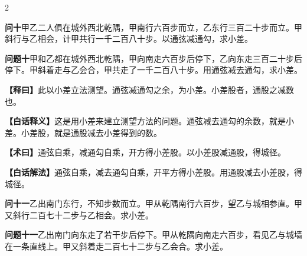 \documentclass[11pt,a4paper]{article}
\newcommand{\WenQuestion}[1]{\textbf{\textcolor{classicalcolor}{#1}}}
\newcommand{\BaiQuestion}[1]{\textbf{\textcolor{moderncolor}{#1}}}
\newcommand{\WenExplain}{\textcolor{classicalcolor}{\textbf{【释曰】}}}
\newcommand{\BaiExplain}{\textcolor{moderncolor}{\textbf{【白话释义】}}}
\newcommand{\WenMethod}{\textcolor{classicalcolor}{\textbf{【术曰】}}}
\newcommand{\BaiMethod}{\textcolor{moderncolor}{\textbf{【白话解法】}}}
\begin{document}
\begin{paracol}{2}

\switchcolumn*
\begin{tcolorbox}[colback=red!3,colframe=red!30!black,boxrule=0.3pt]
\WenQuestion{问十}\quad 甲乙二人俱在城外西北乾隅，甲南行六百步而立，乙东行三百二十步而立。甲斜行与乙相会，计甲共行一千二百八十步。以通弦减通勾，求小差。
\end{tcolorbox}
\switchcolumn
\begin{tcolorbox}[colback=blue!3,colframe=blue!30!black,boxrule=0.3pt]
\BaiQuestion{问题十}\quad 甲和乙都在城外西北乾隅，甲向南走六百步后停下，乙向东走三百二十步后停下。甲斜着走与乙会合，甲共走了一千二百八十步。用通弦减去通勾，求小差。
\end{tcolorbox}

\switchcolumn*
\begin{tcolorbox}[colback=red!5,colframe=red!30!black,boxrule=0.3pt]
\WenExplain\quad 此以小差立法测望。通弦减通勾之余，为小差。小差股者，通股之减数也。
\end{tcolorbox}
\switchcolumn
\begin{tcolorbox}[colback=blue!5,colframe=blue!30!black,boxrule=0.3pt]
\BaiExplain\quad 这是用小差来建立测望方法的问题。通弦减去通勾的余数，就是小差。小差股，就是通股减去小差得到的数。
\end{tcolorbox}

\switchcolumn*
\begin{tcolorbox}[colback=red!5,colframe=red!40!black,boxrule=0.3pt]
\WenMethod\quad 通弦自乘，减通勾自乘，开方得小差股。以小差股减通股，得城径。
\end{tcolorbox}
\switchcolumn
\begin{tcolorbox}[colback=blue!5,colframe=blue!40!black,boxrule=0.3pt]
\BaiMethod\quad 通弦自乘，减去通勾自乘，开平方得小差股。用通股减去小差股，得城径。
\end{tcolorbox}

\vspace{0.8em}

\switchcolumn*
\begin{tcolorbox}[colback=red!3,colframe=red!30!black,boxrule=0.3pt]
\WenQuestion{问十一}\quad 乙出南门东行，不知步数而立。甲从乾隅南行六百步，望乙与城相参直。甲又斜行二百七十二步与乙相会。求小差。
\end{tcolorbox}
\switchcolumn
\begin{tcolorbox}[colback=blue!3,colframe=blue!30!black,boxrule=0.3pt]
\BaiQuestion{问题十一}\quad 乙出南门向东走了若干步后停下。甲从乾隅向南走六百步，看见乙与城墙在一条直线上。甲又斜着走二百七十二步与乙会合。求小差。
\end{tcolorbox}


\end{paracol}
\end{document}
